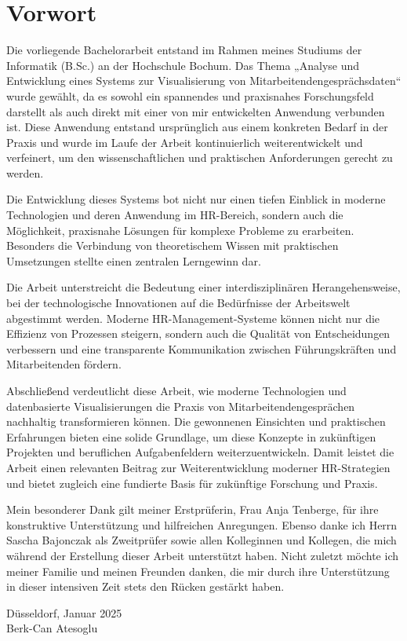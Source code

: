 \chapter*{Vorwort}

Die vorliegende Bachelorarbeit entstand im Rahmen meines Studiums der Informatik (B.Sc.) an der Hochschule Bochum. Das Thema „Analyse und Entwicklung eines Systems zur Visualisierung von Mitarbeitendengesprächsdaten“ wurde gewählt, da es sowohl ein spannendes und praxisnahes Forschungsfeld darstellt als auch direkt mit einer von mir entwickelten Anwendung verbunden ist. Diese Anwendung entstand ursprünglich aus einem konkreten Bedarf in der Praxis und wurde im Laufe der Arbeit kontinuierlich weiterentwickelt und verfeinert, um den wissenschaftlichen und praktischen Anforderungen gerecht zu werden.

Die Entwicklung dieses Systems bot nicht nur einen tiefen Einblick in moderne Technologien und deren Anwendung im HR-Bereich, sondern auch die Möglichkeit, praxisnahe Lösungen für komplexe Probleme zu erarbeiten. Besonders die Verbindung von theoretischem Wissen mit praktischen Umsetzungen stellte einen zentralen Lerngewinn dar.

Die Arbeit unterstreicht die Bedeutung einer interdisziplinären Herangehensweise, bei der technologische Innovationen auf die Bedürfnisse der Arbeitswelt abgestimmt werden. Moderne HR-Management-Systeme können nicht nur die Effizienz von Prozessen steigern, sondern auch die Qualität von Entscheidungen verbessern und eine transparente Kommunikation zwischen Führungskräften und Mitarbeitenden fördern. 

Abschließend verdeutlicht diese Arbeit, wie moderne Technologien und datenbasierte Visualisierungen die Praxis von Mitarbeitendengesprächen nachhaltig transformieren können. Die gewonnenen Einsichten und praktischen Erfahrungen bieten eine solide Grundlage, um diese Konzepte in zukünftigen Projekten und beruflichen Aufgabenfeldern weiterzuentwickeln. Damit leistet die Arbeit einen relevanten Beitrag zur Weiterentwicklung moderner HR-Strategien und bietet zugleich eine fundierte Basis für zukünftige Forschung und Praxis.

Mein besonderer Dank gilt meiner Erstprüferin, Frau Anja Tenberge, für ihre konstruktive Unterstützung und hilfreichen Anregungen. Ebenso danke ich Herrn Sascha Bajonczak als Zweitprüfer sowie allen Kolleginnen und Kollegen, die mich während der Erstellung dieser Arbeit unterstützt haben. Nicht zuletzt möchte ich meiner Familie und meinen Freunden danken, die mir durch ihre Unterstützung in dieser intensiven Zeit stets den Rücken gestärkt haben.

\vspace{1cm}

\begin{flushright}
Düsseldorf, Januar 2025 \\
Berk-Can Atesoglu
\end{flushright}
